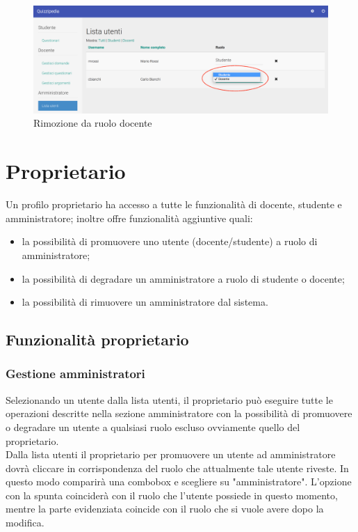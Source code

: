 \documentclass[12pt,a4paper]{article}
\begin{document}
		\begin{figure}[H]
			\centering
			\includegraphics[width=1\linewidth]{../img/screenshot/cambioRuoloDocStud.png}
			\caption{Rimozione da ruolo docente}
			\label{Rimozione da ruolo docente}
		\end{figure}
	
	\section{Proprietario} 
	\par Un profilo proprietario ha accesso a tutte le funzionalità di docente, studente e amministratore; inoltre offre funzionalità aggiuntive quali: \\
	\begin{itemize}
		\item la possibilità di promuovere uno utente (docente/studente) a ruolo di amministratore;
		\item la possibilità di degradare un amministratore a ruolo di studente o docente;
		\item la possibilità di rimuovere un amministratore dal sistema.
	\end{itemize}
	\subsection{Funzionalità proprietario}
	
	\subsubsection{Gestione  amministratori}
	\par Selezionando un utente dalla lista utenti, il proprietario può eseguire tutte le operazioni descritte nella sezione amministratore con la possibilità di promuovere o degradare un utente a qualsiasi ruolo escluso ovviamente quello del proprietario. \\
	
	Dalla lista utenti il proprietario per promuovere un utente ad amministratore dovrà cliccare in corrispondenza del ruolo che attualmente tale utente riveste. In questo modo comparirà una combobox e scegliere su "amministratore". L'opzione con la spunta coinciderà con il ruolo che l'utente possiede in questo momento, mentre la parte evidenziata coincide con il ruolo che si vuole avere dopo la modifica.
	
\end{document}
